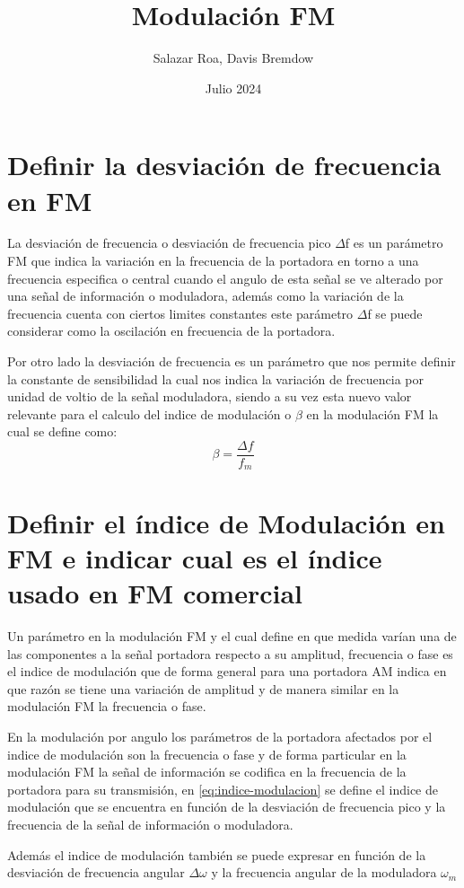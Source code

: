 \documentclass[]{article}
\title{Modulación FM}
\author{Salazar Roa, Davis Bremdow}
\date{ Julio 2024}
\begin{document}
	
	\section{Definir la desviación de frecuencia en FM}
	La desviación de frecuencia o desviación de frecuencia pico $\Delta$f es un parámetro FM que indica la variación en la frecuencia de la portadora en torno a una frecuencia especifica o central cuando el angulo de esta señal se ve alterado por una señal de información o moduladora, además como la variación de la frecuencia cuenta con ciertos limites constantes este parámetro $\Delta$f se puede considerar como la oscilación en frecuencia de la portadora.
	
	Por otro lado la desviación de frecuencia es un parámetro que nos permite definir la constante de sensibilidad la cual nos indica la variación de frecuencia por unidad de voltio de la señal moduladora, siendo a su vez esta nuevo valor relevante para el calculo del indice de modulación o $\beta$ en la modulación FM la cual se define como: \\
	\begin{equation}
		\beta = \frac{\Delta f}{f_m} \label{eq:indice-modulacion}
	\end{equation}
	
	
	\section{Definir el índice de Modulación en FM e indicar cual es el índice usado en FM comercial}
	Un parámetro en la modulación FM y el cual define en que medida varían una de las componentes a la señal portadora respecto a su amplitud, frecuencia o fase es el indice de modulación que de forma general para una portadora AM indica en que razón se tiene una variación de amplitud y de manera similar en la modulación FM la frecuencia o fase.
	
	En la modulación por angulo los parámetros de la portadora afectados por el indice de modulación son la frecuencia o fase y de forma particular en la modulación FM la señal de información se codifica en la frecuencia de la portadora para su transmisión, en \ref{eq:indice-modulacion} se define el indice de modulación que se encuentra en función de la desviación de frecuencia pico y la frecuencia de la señal de información o moduladora.
	
	Además el indice de modulación también se puede expresar en función de la desviación de frecuencia angular  $\Delta\omega$ y la frecuencia angular de la moduladora $\omega_m$
	
\end{document}
